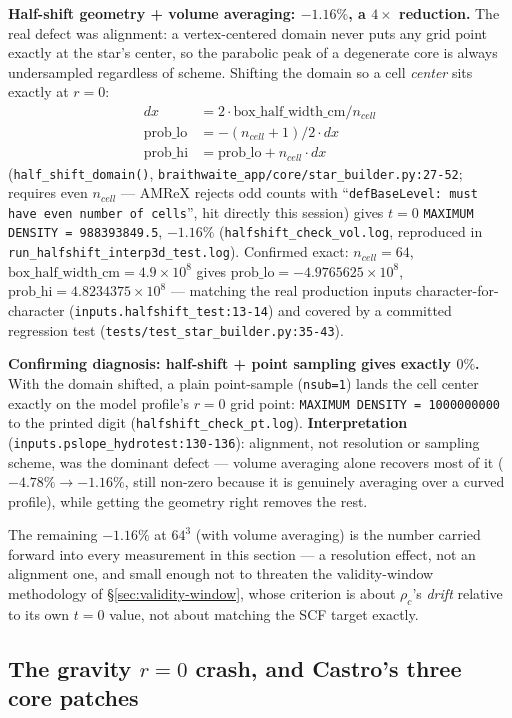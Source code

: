 \documentclass[11pt,a4paper]{scrartcl}
\newcommand{\code}[1]{\texttt{\small #1}}
\begin{document}
\textbf{Half-shift geometry + volume averaging: $-1.16\%$, a $4\times$
reduction.} The real defect was alignment: a vertex-centered domain
never puts any grid point exactly at the star's center, so the
parabolic peak of a degenerate core is always undersampled regardless
of scheme. Shifting the domain so a cell \emph{center} sits exactly at
$r=0$:
\[
\begin{aligned}
dx &= 2\cdot\text{box\_half\_width\_cm} / n_{cell}\\
\text{prob\_lo} &= -(n_{cell}+1)/2\cdot dx\\
\text{prob\_hi} &= \text{prob\_lo} + n_{cell}\cdot dx
\end{aligned}
\]
(\code{half\_shift\_domain()}, \code{braithwaite\_app/core/star\_builder.py:27-52};
requires even $n_{cell}$ --- AMReX rejects odd counts with
``\code{defBaseLevel: must have even number of cells}'', hit directly
this session) gives $t=0$ \code{MAXIMUM DENSITY = 988393849.5},
$-1.16\%$ (\code{halfshift\_check\_vol.log}, reproduced in
\code{run\_halfshift\_interp3d\_test.log}). Confirmed exact:
$n_{cell}=64$, $\text{box\_half\_width\_cm}=4.9\times10^8$ gives
$\text{prob\_lo}=-4.9765625\times10^8$,
$\text{prob\_hi}=4.8234375\times10^8$ --- matching the real production
inputs character-for-character (\code{inputs.halfshift\_test:13-14})
and covered by a committed regression test
(\code{tests/test\_star\_builder.py:35-43}).

\textbf{Confirming diagnosis: half-shift + point sampling gives exactly
$0\%$.} With the domain shifted, a plain point-sample (\code{nsub=1})
lands the cell center exactly on the model profile's $r=0$ grid point:
\code{MAXIMUM DENSITY = 1000000000} to the printed digit
(\code{halfshift\_check\_pt.log}). \textbf{Interpretation}
(\code{inputs.pslope\_hydrotest:130-136}): alignment, not resolution or
sampling scheme, was the dominant defect --- volume averaging alone
recovers most of it ($-4.78\%\to-1.16\%$, still non-zero because it is
genuinely averaging over a curved profile), while getting the geometry
right removes the rest.

The remaining $-1.16\%$ at $64^3$ (with volume averaging) is the number
carried forward into every measurement in this section --- a resolution
effect, not an alignment one, and small enough not to threaten the
validity-window methodology of \S\ref{sec:validity-window}, whose
criterion is about $\rho_c$'s \emph{drift} relative to its own $t=0$
value, not about matching the SCF target exactly.

\subsection{The gravity \texorpdfstring{$r=0$}{r=0} crash, and Castro's three core patches}
\label{sec:gravity-patches}
\end{document}
